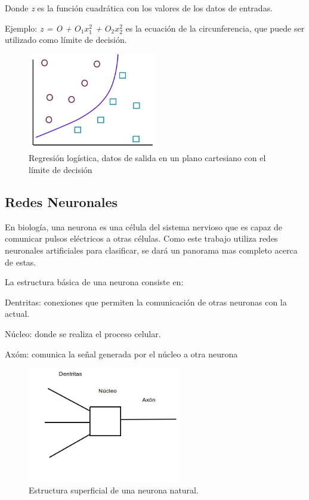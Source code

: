 \documentclass[a4paper,12pt,oneside,spanish]{book}
\begin{document}
Donde \textit{z} es la función cuadrática con los valores de los datos de entradas. \par

Ejemplo: \textit{z = O + $O_1$$x^2_1$ + $O_2$$x^2_2$}  es la ecuación de la circunferencia, que puede ser utilizado como límite de decisión.

\begin{figure}[h!]
	\includegraphics[width=160pt]{Imagenes/regresion2.jpg}
	\centering
	\caption{Regresión logística, datos de salida en un plano cartesiano con el límite de decisión}
	\label{fig:regresion2}
\end{figure}


\subsection{Redes Neuronales}

En biología, una neurona es una célula del sistema nervioso que es capaz de comunicar pulsos eléctricos a otras células. Como este trabajo utiliza redes neuronales artificiales para clasificar, se dará un panorama mas completo acerca de estas. \par

La estructura básica de una neurona consiste en:
\begin{compactitem}
	\item Dentritas: conexiones que permiten la comunicación de otras neuronas con la actual.
	\item Núcleo: donde se realiza el proceso celular.
	\item Axóm: comunica la señal generada por el núcleo a otra neurona
\end{compactitem}

\begin{figure}[h!]
	\includegraphics[width=190pt]{Imagenes/neurona.jpg}
	\centering
	\caption{Estructura superficial de una neurona natural.}
	\label{fig:haarlike1}
\end{figure}
\end{document}

